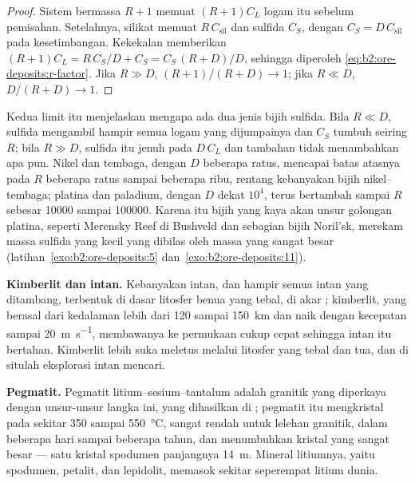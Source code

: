 \begin{proof}
Sistem bermassa $R + 1$ memuat $(R + 1)C_L$ logam itu sebelum pemisahan. Setelahnya, silikat
memuat $R\,C_{\mathrm{sil}}$ dan sulfida $C_S$, dengan $C_S = D\,C_{\mathrm{sil}}$ pada kesetimbangan.
Kekekalan memberikan $(R + 1)C_L = R\,C_S/D + C_S = C_S\,(R + D)/D$, sehingga diperoleh
\eqref{eq:b2:ore-deposits:r-factor}. Jika $R \gg D$, $(R + 1)/(R + D) \to 1$; jika $R \ll D$,
$D/(R + D) \to 1$.
\end{proof}

Kedua limit itu menjelaskan mengapa ada dua jenis bijih sulfida. Bila $R \ll D$, sulfida mengambil
hampir semua logam  yang dijumpainya dan $C_S$ tumbuh seiring $R$; bila $R \gg D$, sulfida itu
jenuh pada $D\,C_L$ dan tambahan  tidak menambahkan apa pun. Nikel dan tembaga, dengan $D$ beberapa ratus,
mencapai batas atasnya pada $R$ beberapa ratus sampai beberapa ribu, rentang kebanyakan bijih nikel--tembaga;
platina dan paladium, dengan $D$ dekat $10^4$, terus bertambah sampai $R$ sebesar \num{10000} sampai
\num{100000}. Karena itu bijih yang kaya akan unsur golongan platina, seperti Merensky Reef di Bushveld dan
sebagian bijih Noril'sk, merekam massa sulfida yang kecil yang dibilas oleh massa  yang sangat
besar (latihan~\ref{exo:b2:ore-deposits:5} dan~\ref{exo:b2:ore-deposits:11}).

\textbf{Kimberlit dan intan.} Kebanyakan intan, dan hampir semua intan yang ditambang, terbentuk di dasar
litosfer benua yang tebal, di akar ;  kimberlit, yang berasal dari kedalaman
lebih dari 120 sampai \qty{150}{km} dan naik dengan kecepatan sampai \qty{20}{m.s^{-1}}, membawanya ke
permukaan cukup cepat sehingga intan itu bertahan. Kimberlit lebih suka meletus melalui litosfer yang tebal dan tua,
dan di situlah eksplorasi intan mencari.

\textbf{Pegmatit.} Pegmatit litium--sesium--tantalum adalah  granitik yang diperkaya dengan unsur-unsur
langka ini, yang dihasilkan di ; pegmatit itu mengkristal pada sekitar 350 sampai \qty{550}{\celsius},
sangat rendah untuk lelehan granitik, dalam beberapa hari sampai beberapa tahun, dan menumbuhkan kristal yang sangat besar --- satu
kristal spodumen panjangnya \qty{14}{m}. Mineral litiumnya, yaitu spodumen, petalit, dan
lepidolit, memasok sekitar seperempat litium dunia.

